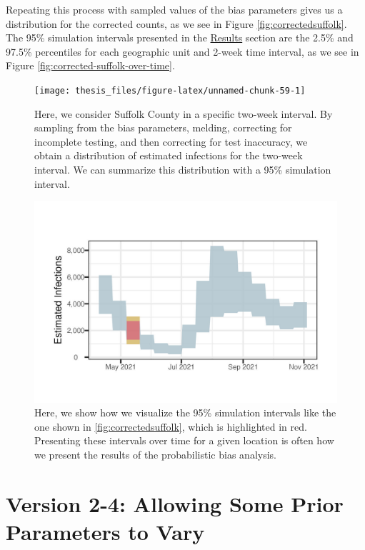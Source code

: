 \documentclass[12pt,twoside]{smiththesis}
\begin{document}
Repeating this process with sampled values of the bias parameters gives us a distribution for the corrected counts, as we see in Figure \ref{fig:correctedsuffolk}. The 95\% simulation intervals presented in the \protect\hyperlink{res}{Results} section are the 2.5\% and 97.5\% percentiles for each geographic unit and 2-week time interval, as we see in Figure \ref{fig:corrected-suffolk-over-time}.
\begin{figure}
\texttt{[image: thesis\_files/figure-latex/unnamed-chunk-59-1]} \caption{\label{fig:correctedsuffolk}Here, we consider Suffolk County in a specific two-week interval. By sampling from the bias parameters, melding, correcting for incomplete testing, and then correcting for test inaccuracy, we obtain a distribution of estimated infections for the two-week interval. We can summarize this distribution with a 95\% simulation interval.}\label{fig:unnamed-chunk-59}
\end{figure}
\begin{figure}
\includegraphics[width=1\linewidth]{../presentation/figure/suffolk_biweek_10} \caption{\label{fig:corrected-suffolk-over-time}Here, we show how we visualize the 95\% simulation intervals like the one shown in \ref{fig:correctedsuffolk}, which is highlighted in red. Presenting these intervals over time for a given location is often how we present the results of the probabilistic bias analysis.}\label{fig:unnamed-chunk-60}
\end{figure}
\hypertarget{version-2-4-allowing-some-prior-parameters-to-vary}{%
\section{Version 2-4: Allowing Some Prior Parameters to Vary}\label{version-2-4-allowing-some-prior-parameters-to-vary}}
\end{document}
